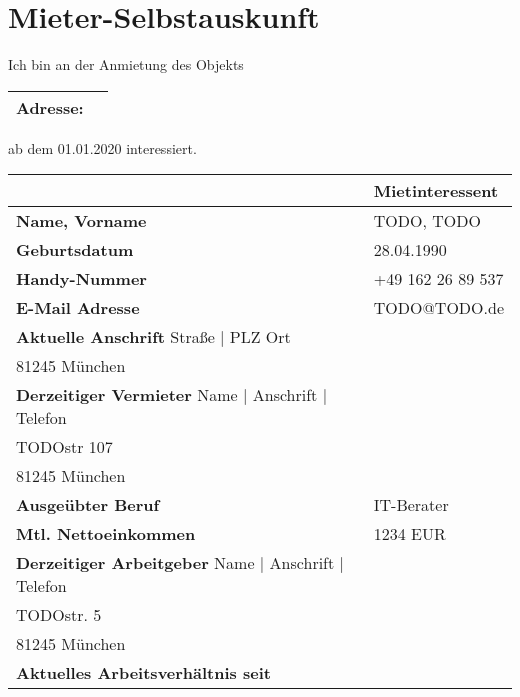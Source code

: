 \documentclass[a4paper]{scrartcl}
\makeatletter
\newcommand{\Vorname}{TODO}            %
\newcommand{\Nachname}{TODO}           %
\newcommand{\Geburtsdatum}{28.04.1990} %
\newcommand{\Mietbeginn}{01.01.2020}   %
\newcommand{\AktuelleAdresse}{TODOstr 107\\81245 München}           %
\newcommand{\NeueAdresse}{TODOstr. 22, 81243 München}               %
\newcommand{\Handy}{+49 162 26 89 537}                              %
\newcommand{\Email}{TODO@TODO.de}                                   %
\newcommand{\Beruf}{IT-Berater}                                     %
\newcommand{\Nettoeinkommen}{1234 EUR}                              %
\newcommand{\Arbeitgeber}{TODO GmbH\\TODOstr. 5\\81245 München}     %
\newcommand{\ArbeitgeberSeit}{19.06.2017}   %
\newcommand{\AktuellerVermieter}{TODO TODO\\TODOstr 107\\81245 München}
\makeatother
\begin{document}
\section*{Mieter-Selbstauskunft}
Ich bin an der Anmietung des Objekts

\bgroup
\def\arraystretch{2}
\begin{table}[h]
\begin{tabularx}{\textwidth}{|Xl|}
\hline
\textbf{Adresse}: \makecell{\NeueAdresse}& \\
\hline
\end{tabularx}
\end{table}
\egroup

ab dem \Mietbeginn{} interessiert.

\bgroup
\def\arraystretch{2}
\begin{table}[h]
\begin{tabularx}{\textwidth}{|X|l|}
\hline
~                                & \textbf{Mietinteressent} \\ \hline
\textbf{Name, Vorname}           & \Nachname, \Vorname \\ \hline
\textbf{Geburtsdatum}            & \Geburtsdatum       \\ \hline
\textbf{Handy-Nummer}            & \Handy              \\ \hline
\textbf{E-Mail Adresse}          & \Email              \\ \hline\hline
\makecell{\textbf{Aktuelle Anschrift} \\ {\tiny Straße $\vert$ PLZ Ort}}      & \makecell{\AktuelleAdresse}  \\ \hline
\makecell{\textbf{Derzeitiger Vermieter} \\ {\tiny Name $\vert$ Anschrift $\vert$ Telefon}}   & \makecell{\AktuellerVermieter} \\ \hline\hline
\textbf{Ausgeübter Beruf}        & \Beruf              \\ \hline
\textbf{Mtl. Nettoeinkommen}     & \Nettoeinkommen     \\ \hline
\makecell{\textbf{Derzeitiger Arbeitgeber}\\ {\tiny Name $\vert$ Anschrift $\vert$ Telefon}} & \makecell{\Arbeitgeber}        \\ \hline
\textbf{Aktuelles Arbeitsverhältnis seit} & \makecell{\ArbeitgeberSeit}        \\ \hline
\end{tabularx}
\end{table}
\egroup
\end{document}
